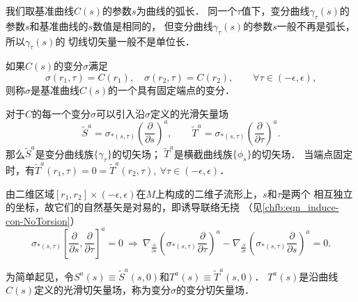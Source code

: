\begin{remark}\label{chgd:remk_cs}
    我们取基准曲线$C(s)$的参数$s$为曲线的弧长．
    同一个$\tau$值下，变分曲线$\gamma_\tau(s)$的参数$s$和基准曲线的$s$数值是相同的，
    但变分曲线$\gamma_\tau(s)$的参数$s$一般不再是弧长，所以$\gamma_\tau(s)$的
    切线切矢量一般不是单位长．
\end{remark}


如果$C(s)$的变分$\sigma$满足
\begin{equation*}
    \sigma(r_1,\tau)=C(r_1), \quad   \sigma(r_2,\tau)=C(r_2), \qquad \forall \tau \in (-\epsilon, \epsilon),
\end{equation*}
则称$\sigma$是基准曲线$C(s)$的一个{\heiti 具有固定端点的变分}．

对于$C$的每一个变分$\sigma$可以引入沿$\sigma$定义的光滑矢量场
\begin{equation}
    \tilde{S}^a = \sigma_{*(s,\tau)}\left(\frac{\partial}{\partial s}\right)^a, \qquad
    \tilde{T}^a = \sigma_{*(s,\tau)}\left(\frac{\partial}{\partial \tau}\right)^a.
\end{equation}
那么$\tilde{S}^a$是变分曲线族$\{\gamma_\tau\}$的切矢场；
$\tilde{T}^a$是横截曲线族$\{\phi_s\}$的切矢场．
当端点固定时，有$\tilde{T}^a(r_1,\tau)=0=\tilde{T}^a(r_2,\tau),\ \forall \tau \in (-\epsilon,\epsilon)$．

由二维区域$[r_1,r_2]\times (-\epsilon, \epsilon)$在$M$上构成的二维子流形上，$s$和$\tau$是两个
相互独立的坐标，故它们的自然基矢是对易的，即诱导联络无挠
（见\eqref{chfb:eqn_induce-con-NoTorsion}）
\begin{equation}\label{chgd:eqn_stts}
    \sigma_{*(s,\tau)}\left[\frac{\partial}{\partial s}, \frac{\partial}{\partial \tau}\right]^a = 0
     {\  \Rightarrow \ }
     \nabla_{\frac{\partial}{\partial s}}
       \left(\sigma_{*(s,\tau)}\frac{\partial}{\partial \tau}\right)^a -
     \nabla_{\frac{\partial}{\partial \tau}}
       \left(\sigma_{*(s,\tau)}\frac{\partial}{\partial s}\right)^a = 0 .
\end{equation}


为简单起见，令$S^a(s)\equiv \tilde{S}^a(s,0)$和$T^a(s)\equiv \tilde{T}^a(s,0)$．
$T^a(s)$是沿曲线$C(s)$定义的光滑切矢量场，称为变分$\sigma$的{\heiti 变分切矢量场}．


